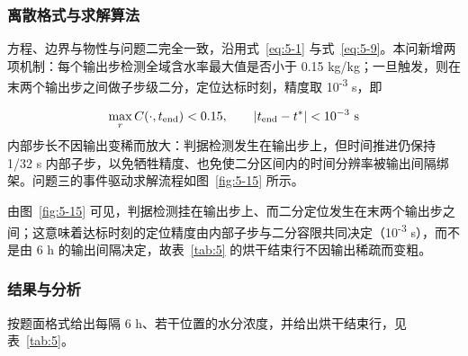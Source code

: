 \subsubsection{离散格式与求解算法}
方程、边界与物性与问题二完全一致，沿用式~\eqref{eq:5-1} 与式~\eqref{eq:5-9}。本问新增两项机制：每个输出步检测全域含水率最大值是否小于 0.15 kg/kg；一旦触发，则在末两个输出步之间做子步级二分，定位达标时刻，精度取 10\textsuperscript{-3} s，即

\begin{equation}
  \max_r C(\cdot,t_{\rm end})<0.15,\qquad |t_{\rm end}-t^{*}|<10^{-3}\ \mathrm s
  \label{eq:5-10}
\end{equation}
内部步长不因输出变稀而放大：判据检测发生在输出步上，但时间推进仍保持 1/32 s 内部子步，以免牺牲精度、也免使二分区间内的时间分辨率被输出间隔绑架。问题三的事件驱动求解流程如图~\ref{fig:5-15} 所示。

由图~\ref{fig:5-15} 可见，判据检测挂在输出步上、而二分定位发生在末两个输出步之间；这意味着达标时刻的定位精度由内部子步与二分容限共同决定（10\textsuperscript{-3} s），而不是由 6 h 的输出间隔决定，故表~\ref{tab:5} 的烘干结束行不因输出稀疏而变粗。

\subsubsection{结果与分析}
按题面格式给出每隔 6 h、若干位置的水分浓度，并给出烘干结束行，见表~\ref{tab:5}。



